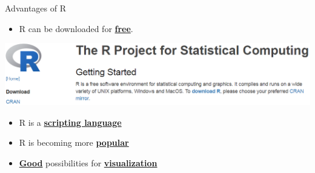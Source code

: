 \documentclass[
  10pt,
  ignorenonframetext,
]{beamer}
\providecommand{\tightlist}{%
  \setlength{\itemsep}{0pt}\setlength{\parskip}{0pt}}
\begin{document}
\begin{frame}{Advantages of R}
\protect\hypertarget{advantages-of-r}{}

\begin{itemize}
\tightlist
\item
  R can be downloaded for
  \href{http://mirrors.softliste.de/cran/}{\textbf{free}}.
\end{itemize}

\includegraphics{figure/forfree.PNG}

\begin{itemize}
\item
  R is a
  \href{https://en.wikipedia.org/wiki/Scripting_language}{\textbf{scripting
  language}}
\item
  R is becoming more
  \href{https://twitter.com/josiahjdavis/status/559778930476220418}{\textbf{popular}}
\item
  \href{http://www.sr.bham.ac.uk/~ajrs/R/r-gallery.html}{\textbf{Good}}
  possibilities for
  \href{http://research.stowers.org/mcm/efg/R/}{\textbf{visualization}}
\end{itemize}

\end{frame}
\end{document}
